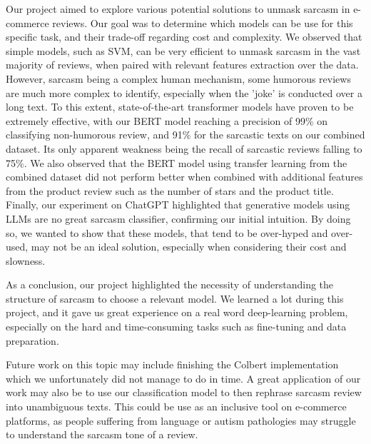 \documentclass[10pt,twocolumn,letterpaper]{article}
\begin{document}
Our project aimed to explore various potential solutions to unmask sarcasm in e-commerce reviews.
Our goal was to determine which models can be use for this specific task, and their trade-off regarding cost and complexity.
We observed that simple models, such as SVM, can be very efficient to unmask sarcasm in the vast majority of reviews, when paired with relevant features extraction over the data.
However, sarcasm being a complex human mechanism, some humorous reviews are much more complex to identify, especially when the 'joke' is conducted over a long text.
To this extent, state-of-the-art transformer models have proven to be extremely effective, with our BERT model reaching a precision of 99\% on classifying non-humorous review, and 91\% for the sarcastic texts on our combined dataset.
Its only apparent weakness being the recall of sarcastic reviews falling to 75\%.
We also observed that the BERT model using transfer learning from the combined dataset did not perform better when combined with additional features from the product review such as the number of stars and the product title.
Finally, our experiment on ChatGPT highlighted that generative models using LLMs are no great sarcasm classifier, confirming our initial intuition.
By doing so, we wanted to show that these models, that tend to be over-hyped and over-used, may not be an ideal solution, especially when considering their cost and slowness.

As a conclusion, our project highlighted the necessity of understanding the structure of sarcasm to choose a relevant model.
We learned a lot during this project, and it gave us great experience on a real word deep-learning problem, especially on the hard and time-consuming tasks such as fine-tuning and data preparation.

Future work on this topic may include finishing the Colbert implementation which we unfortunately did not manage to do in time.
A great application of our work may also be to use our classification model to then rephrase sarcasm review into unambiguous texts.
This could be use as an inclusive tool on e-commerce platforms, as people suffering from language or autism pathologies may struggle to understand the sarcasm tone of a review.



\nocite{*}
{\small


}
\end{document}
